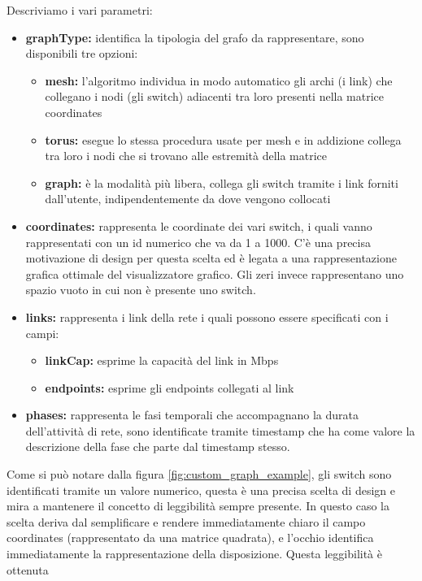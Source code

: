 \documentclass[binding=0.6cm]{sapthesis}
\begin{document}
Descriviamo i vari parametri:
\begin{itemize}
    \item \textbf{graphType:} identifica la tipologia del grafo da rappresentare, sono disponibili tre opzioni:
    \begin{itemize}
        \item \textbf{mesh:} l'algoritmo individua in modo automatico gli archi (i link) che collegano i nodi (gli switch) adiacenti tra loro presenti nella matrice coordinates
        \item \textbf{torus:} esegue lo stessa procedura usate per mesh e in addizione collega tra loro i nodi che si trovano alle estremità della matrice
        \item \textbf{graph:} è la modalità più libera, collega gli switch tramite i link forniti dall'utente, indipendentemente da dove vengono collocati
    \end{itemize}
    \item \textbf{coordinates:} rappresenta le coordinate dei vari switch, i quali vanno rappresentati con un id numerico che va da 1 a 1000. C'è una precisa motivazione di design per questa scelta ed è legata a una rappresentazione grafica ottimale del visualizzatore grafico. Gli zeri invece rappresentano uno spazio vuoto in cui non è presente uno switch.
    \item \textbf{links:} rappresenta i link della rete i quali possono essere specificati con i campi:
    \begin{itemize}
        \item \textbf{linkCap:} esprime la capacità del link in Mbps
        \item \textbf{endpoints:} esprime gli endpoints collegati al link
    \end{itemize}
    \item \textbf{phases:} rappresenta le fasi temporali che accompagnano la durata dell'attività di rete, sono identificate tramite timestamp che ha come valore la descrizione della fase che parte dal timestamp stesso.
\end{itemize}
Come si può notare dalla figura \ref{fig:custom_graph_example}, gli switch sono identificati tramite un valore numerico, 
questa è una precisa scelta di design e mira a mantenere il concetto di leggibilità sempre
presente. In questo caso la scelta deriva dal semplificare e rendere immediatamente chiaro il campo coordinates 
(rappresentato da una matrice quadrata), e l'occhio identifica immediatamente la rappresentazione della disposizione. Questa leggibilità è ottenuta
\end{document}
